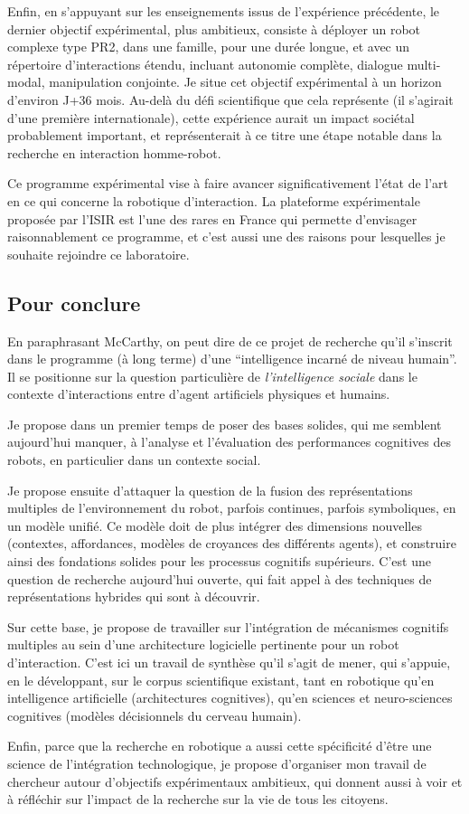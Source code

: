 \documentclass[a4paper]{article}
\begin{document}
Enfin, en s'appuyant sur les enseignements issus de l'expérience précédente, le
dernier objectif expérimental, plus ambitieux, consiste à déployer un robot
complexe type PR2, dans une famille, pour une durée longue, et avec un
répertoire d'interactions étendu, incluant autonomie complète, dialogue
multi-modal, manipulation conjointe. Je situe cet objectif expérimental à un
horizon d'environ J+36 mois. Au-delà du défi scientifique que cela représente
(il s'agirait d'une première internationale), cette expérience aurait un impact
sociétal probablement important, et représenterait à ce titre une étape notable
dans la recherche en interaction homme-robot.

Ce programme expérimental vise à faire avancer significativement l'état de l'art
en ce qui concerne la robotique d'interaction. La plateforme expérimentale
proposée par l'ISIR est l'une des rares en France qui permette d'envisager
raisonnablement ce programme, et c'est aussi une des raisons pour lesquelles je
souhaite rejoindre ce laboratoire.

\subsection{Pour conclure}

En paraphrasant McCarthy, on peut dire de ce projet de recherche qu'il s'inscrit
dans le programme (à long terme) d'une ``intelligence incarné de niveau
humain''. Il se positionne sur la question particulière de \emph{l'intelligence
sociale} dans le contexte d'interactions entre d'agent artificiels physiques et
humains.

Je propose dans un premier temps de poser des bases solides, qui me semblent
aujourd'hui manquer, à l'analyse et l'évaluation des performances cognitives des
robots, en particulier dans un contexte social.

Je propose ensuite d'attaquer la question de la fusion des représentations
multiples de l'environnement du robot, parfois continues, parfois symboliques,
en un modèle unifié. Ce modèle doit de plus intégrer des dimensions nouvelles
(contextes, affordances, modèles de croyances des différents agents), et
construire ainsi des fondations solides pour les processus cognitifs supérieurs.
C'est une question de recherche aujourd'hui ouverte, qui fait appel à des
techniques de représentations hybrides qui sont à découvrir.

Sur cette base, je propose de travailler sur l'intégration de mécanismes
cognitifs multiples au sein d'une architecture logicielle pertinente pour un
robot d'interaction. C'est ici un travail de synthèse qu'il s'agit de mener, qui
s'appuie, en le développant, sur le corpus scientifique existant, tant en
robotique qu'en intelligence artificielle (architectures cognitives), qu'en
sciences et neuro-sciences cognitives (modèles décisionnels du cerveau humain).

Enfin, parce que la recherche en robotique a aussi cette spécificité d'être une
science de l'intégration technologique, je propose d'organiser mon travail de
chercheur autour d'objectifs expérimentaux ambitieux, qui donnent aussi à voir
et à réfléchir sur l'impact de la recherche sur la vie de tous les citoyens.

\printbibliography
\end{document}
